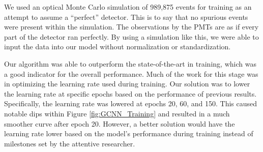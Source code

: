 \documentclass[../thesis.tex]{subfiles}
\begin{document}
\par We used an optical Monte Carlo simulation of 989,875 events for training as an attempt to assume a “perfect” detector.
This is to say that no spurious events were present within the simulation.
The observations by the PMTs are as if every part of the detector ran perfectly.
By using a simulation like this, we were able to input the data into our model without normalization or standardization.

\par Our algorithm was able to outperform the state-of-the-art in training, which was a good indicator for the overall performance.
Much of the work for this stage was in optimizing the learning rate used during training.
Our solution was to lower the learning rate at specific epochs based on the performance of  previous results.
Specifically, the learning rate was lowered at epochs 20, 60, and 150.
This caused notable dips within Figure \ref{fig:GCNN_Training} and resulted in a much smoother curve after epoch 20.
However, a better solution would have the learning rate lower based on the model's performance during training instead of milestones set by the attentive researcher.
\end{document}
